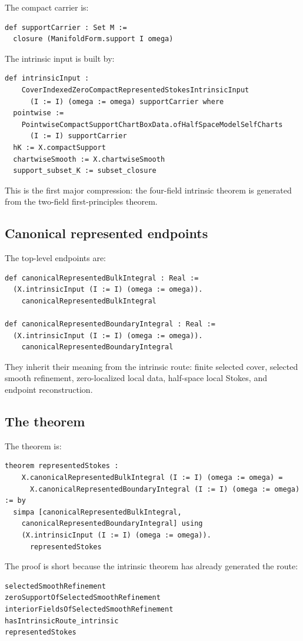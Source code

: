 The compact carrier is:
\begin{lstlisting}[language=Lean]
def supportCarrier : Set M :=
  closure (ManifoldForm.support I omega)
\end{lstlisting}
The intrinsic input is built by:
\begin{lstlisting}[language=Lean]
def intrinsicInput :
    CoverIndexedZeroCompactRepresentedStokesIntrinsicInput
      (I := I) (omega := omega) supportCarrier where
  pointwise :=
    PointwiseCompactSupportChartBoxData.ofHalfSpaceModelSelfCharts
      (I := I) supportCarrier
  hK := X.compactSupport
  chartwiseSmooth := X.chartwiseSmooth
  support_subset_K := subset_closure
\end{lstlisting}
This is the first major compression: the four-field intrinsic theorem is
generated from the two-field first-principles theorem.

\subsection{Canonical represented endpoints}

The top-level endpoints are:
\begin{lstlisting}[language=Lean]
def canonicalRepresentedBulkIntegral : Real :=
  (X.intrinsicInput (I := I) (omega := omega)).
    canonicalRepresentedBulkIntegral

def canonicalRepresentedBoundaryIntegral : Real :=
  (X.intrinsicInput (I := I) (omega := omega)).
    canonicalRepresentedBoundaryIntegral
\end{lstlisting}
They inherit their meaning from the intrinsic route: finite selected cover,
selected smooth refinement, zero-localized local data, half-space local
Stokes, and endpoint reconstruction.

\subsection{The theorem}

The theorem is:
\begin{lstlisting}[language=Lean]
theorem representedStokes :
    X.canonicalRepresentedBulkIntegral (I := I) (omega := omega) =
      X.canonicalRepresentedBoundaryIntegral (I := I) (omega := omega) := by
  simpa [canonicalRepresentedBulkIntegral,
    canonicalRepresentedBoundaryIntegral] using
    (X.intrinsicInput (I := I) (omega := omega)).
      representedStokes
\end{lstlisting}
The proof is short because the intrinsic theorem has already generated the
route:
\begin{lstlisting}[language=Lean]
selectedSmoothRefinement
zeroSupportOfSelectedSmoothRefinement
interiorFieldsOfSelectedSmoothRefinement
hasIntrinsicRoute_intrinsic
representedStokes
\end{lstlisting}

